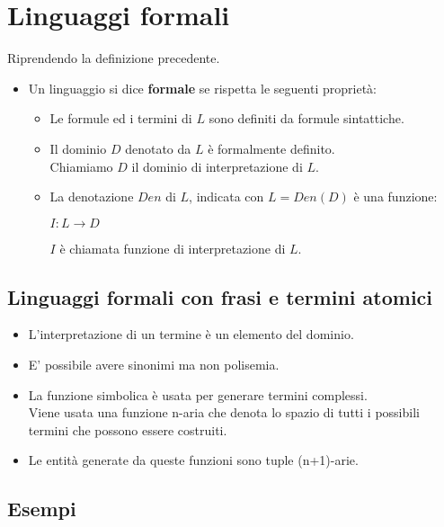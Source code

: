 \documentclass[../main.tex]{subfiles}
\begin{document}
    \section{Linguaggi formali}
    Riprendendo la definizione precedente.
    \begin{itemize}
        \item Un linguaggio si dice \textbf{formale} se rispetta le seguenti proprietà:
        \begin{itemize}
            \item Le formule ed i termini di $L$ sono definiti da formule sintattiche.
            \item Il dominio $D$ denotato da $L$ è formalmente definito.\\
                Chiamiamo $D$ il dominio di interpretazione di $L$.
            \item La denotazione $Den$ di $L$, indicata con $L=Den(D)$ è una funzione:
            \begin{center}
                $I:L \to D$
            \end{center}
            $I$ è chiamata funzione di interpretazione di $L$.
        \end{itemize}
    \end{itemize}

    \subsection{Linguaggi formali con frasi e termini atomici}
    \begin{itemize}
        \item L'interpretazione di un termine è un elemento del dominio.
        \item E' possibile avere sinonimi ma non polisemia.
        \item La funzione simbolica è usata per generare termini complessi.\\
                Viene usata una funzione n-aria che denota lo spazio di tutti i possibili termini che possono essere costruiti. 
        \item Le entità generate da queste funzioni sono tuple (n+1)-arie.
    \end{itemize}

    \subsection{Esempi}
\end{document}
